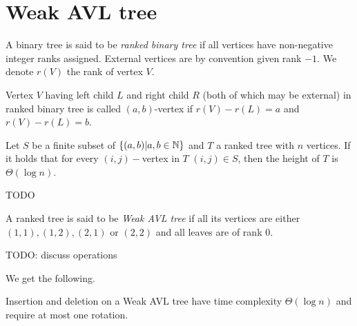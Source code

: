\section{Weak AVL tree}

\begin{defn}
A binary tree is said to be {\em ranked binary tree} if all vertices have non-negative integer ranks assigned. External vertices are by convention given rank $-1$. We denote $r(V)$ the rank of vertex $V$.
\end{defn}

\begin{defn}
Vertex $V$ having left child $L$ and right child $R$ (both of which may be external) in ranked binary tree is called $(a,b)$-vertex if $r(V) - r(L) = a$ and $r(V) - r(L) = b$.
\end{defn}

\begin{thm}
Let $S$ be a finite subset of $\{ (a,b) | a,b \in \mathbb{N} \}$ and $T$ a ranked tree with $n$ vertices. If it holds that for every $(i,j)-$vertex in $T$ $(i,j) \in S$, then the height of $T$ is $\Theta(\log n)$.
\end{thm}

\begin{myproof}
TODO
\end{myproof}

\begin{defn}
A ranked tree is said to be {\em Weak AVL tree} if all its vertices are either $(1,1), (1,2), (2,1)$ or $(2,2)$ and all leaves are of rank 0.
\end{defn}

TODO: discuss operations

We get the following.

\begin{prop}
Insertion and deletion on a Weak AVL tree have time complexity $\Theta(\log n)$ and require at most one rotation.
\end{prop}
